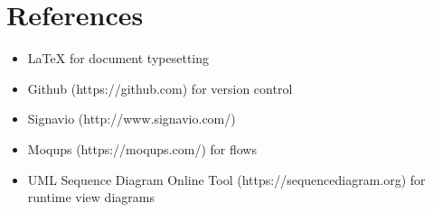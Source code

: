 \chapter{References}
		\begin{itemize}
			\item \LaTeX {  for document typesetting}
			\item Github (https://github.com) for version control
			\item Signavio (http://www.signavio.com/) 
			\item Moqups (https://moqups.com/) for flows
			\item UML Sequence Diagram Online Tool (https://sequencediagram.org) for runtime view diagrams
		\end{itemize}